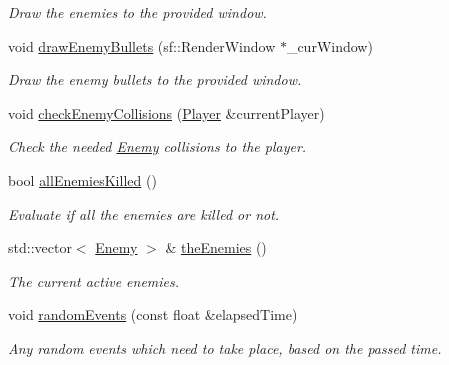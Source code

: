 \begin{DoxyCompactItemize}
\begin{DoxyCompactList}\small\item\em Draw the enemies to the provided window. \end{DoxyCompactList}\item 
void \hyperlink{class_enemy_manager_ae551aa23d45b17e6c9b3d5b12e39ab26}{draw\+Enemy\+Bullets} (sf\+::\+Render\+Window $\ast$\+\_\+cur\+Window)
\begin{DoxyCompactList}\small\item\em Draw the enemy bullets to the provided window. \end{DoxyCompactList}\item 
void \hyperlink{class_enemy_manager_a317b11ce52e67c7b760b2b81755fd95f}{check\+Enemy\+Collisions} (\hyperlink{class_player}{Player} \&current\+Player)
\begin{DoxyCompactList}\small\item\em Check the needed \hyperlink{class_enemy}{Enemy} collisions to the player. \end{DoxyCompactList}\item 
\mbox{\label{class_enemy_manager_a9395ad36205c9653b4511859fb82179a}} 
bool \hyperlink{class_enemy_manager_a9395ad36205c9653b4511859fb82179a}{all\+Enemies\+Killed} ()
\begin{DoxyCompactList}\small\item\em Evaluate if all the enemies are killed or not. \end{DoxyCompactList}\item 
\mbox{\label{class_enemy_manager_afee94a1383c9ec47a8a8ebb4fa4a2f7b}} 
std\+::vector$<$ \hyperlink{class_enemy}{Enemy} $>$ \& \hyperlink{class_enemy_manager_afee94a1383c9ec47a8a8ebb4fa4a2f7b}{the\+Enemies} ()
\begin{DoxyCompactList}\small\item\em The current active enemies. \end{DoxyCompactList}\item 
void \hyperlink{class_enemy_manager_abafa080764d42fbc020c33e48c7afb2f}{random\+Events} (const float \&elapsed\+Time)
\begin{DoxyCompactList}\small\item\em Any random events which need to take place, based on the passed time. \end{DoxyCompactList}\item 
\mbox{\label{class_enemy_manager_a5aacf80c75d457dfc2274c5f3be3ca96}} 

\end{DoxyCompactItemize}
